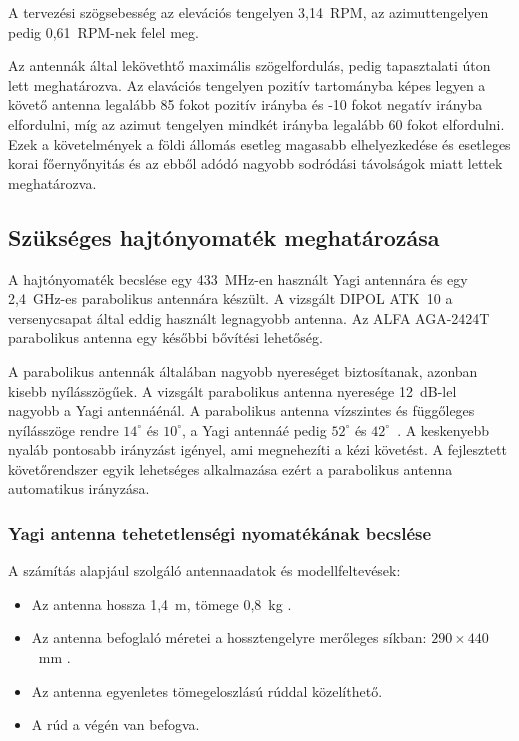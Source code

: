 A tervezési szögsebesség az elevációs tengelyen
3,14~RPM, az azimuttengelyen pedig
0,61~RPM-nek felel meg.

Az antennák által lekövethtő maximális szögelfordulás, pedig tapasztalati úton lett meghatározva.
Az elavációs tengelyen pozitív tartományba képes legyen a követő antenna legalább 85 fokot pozitív irányba és -10 fokot
negatív irányba elfordulni, míg az azimut tengelyen mindkét irányba legalább 60 fokot elfordulni.
Ezek a követelmények a földi állomás esetleg magasabb elhelyezkedése és esetleges korai főernyőnyitás
és az ebből adódó nagyobb sodródási távolságok miatt lettek meghatározva. 

\subsection{Szükséges hajtónyomaték meghatározása}
A hajtónyomaték becslése egy 433~MHz-en használt Yagi
antennára és egy 2,4~GHz-es parabolikus antennára készült.
A vizsgált DIPOL ATK~10 a versenycsapat által eddig használt
legnagyobb antenna. Az ALFA AGA-2424T parabolikus antenna
egy későbbi bővítési lehetőség.

A parabolikus antennák általában nagyobb nyereséget
biztosítanak, azonban kisebb nyílásszögűek.
A vizsgált parabolikus antenna nyeresége 12~dB-lel
nagyobb a Yagi antennáénál. A parabolikus antenna
vízszintes és függőleges nyílásszöge rendre $14^\circ$
és $10^\circ$, a Yagi antennáé pedig $52^\circ$ és
$42^\circ$~\cite{parabolic-antenna,yagi-antenna}.
A keskenyebb nyaláb pontosabb irányzást igényel, ami
megnehezíti a kézi követést. A fejlesztett követőrendszer
egyik lehetséges alkalmazása ezért a parabolikus antenna
automatikus irányzása.


\subsubsection{Yagi antenna tehetetlenségi nyomatékának becslése}
A számítás alapjául szolgáló antennaadatok és
modellfeltevések:
\begin{itemize}
    \item Az antenna hossza 1,4~m, tömege 0,8~kg
          \cite{yagi-antenna}.
    \item Az antenna befoglaló méretei a hossztengelyre
          merőleges síkban: $290 \times 440$~mm
          \cite{yagi-antenna}.
    \item Az antenna egyenletes tömegeloszlású rúddal
          közelíthető.
    \item A rúd a végén van befogva.
\end{itemize}


